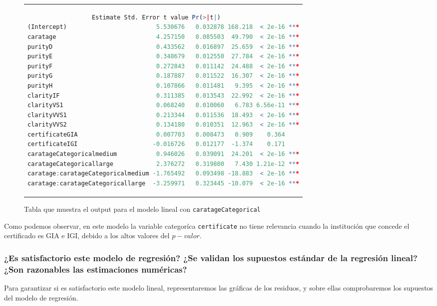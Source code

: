 \documentclass[a4paper, 9pt]{article}
\begin{document}
\begin{figure}[H]
    \centering
    \begin{tabular}{c}
        \begin{lstlisting}[language=r]
                                    Estimate Std. Error t value Pr(>|t|)    
(Intercept)                         5.530676   0.032878 168.218  < 2e-16 ***
caratage                            4.257150   0.085503  49.790  < 2e-16 ***
purityD                             0.433562   0.016897  25.659  < 2e-16 ***
purityE                             0.348679   0.012550  27.784  < 2e-16 ***
purityF                             0.272843   0.011142  24.488  < 2e-16 ***
purityG                             0.187887   0.011522  16.307  < 2e-16 ***
purityH                             0.107866   0.011481   9.395  < 2e-16 ***
clarityIF                           0.311385   0.013543  22.992  < 2e-16 ***
clarityVS1                          0.068240   0.010060   6.783 6.56e-11 ***
clarityVVS1                         0.213344   0.011536  18.493  < 2e-16 ***
clarityVVS2                         0.134180   0.010351  12.963  < 2e-16 ***
certificateGIA                      0.007703   0.008473   0.909    0.364    
certificateIGI                     -0.016726   0.012177  -1.374    0.171    
caratageCategoricalmedium           0.946026   0.039091  24.201  < 2e-16 ***
caratageCategoricallarge            2.376272   0.319800   7.430 1.21e-12 ***
caratage:caratageCategoricalmedium -1.765492   0.093498 -18.883  < 2e-16 ***
caratage:caratageCategoricallarge  -3.259971   0.323445 -10.079  < 2e-16 ***
        \end{lstlisting}
    \end{tabular}
    \caption{Tabla que muestra el output para el modelo lineal con \texttt{caratageCategorical}}
    \label{fig:summary_model}
\end{figure}

Como podemos observar, en este modelo la variable categoríca \texttt{certificate} no tiene relevancia cuando la institución que concede el certificado es GIA e IGI, debido a los altos valores del $p-valor$.


\subsubsection{¿Es satisfactorio este modelo de regresión? ¿Se validan los supuestos estándar de la regresión lineal? ¿Son razonables las estimaciones numéricas?}

Para garantizar si es satisfactorio este modelo lineal, representaremos las gráficas de los residuos, y sobre ellas comprobaremos los supuestos del modelo de regresión.
\end{document}
